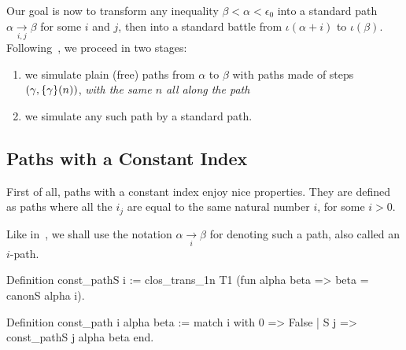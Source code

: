Our goal is now  to transform any inequality $\beta<\alpha<\epsilon_0$ into a standard path $\alpha \xrightarrow[i,j]{} \beta$ for some $i$ and $j$, then into a standard battle
from $\iota(\alpha+i)$ to $\iota(\beta)$. 
Following~\cite{KS81}, we proceed in two stages:
\begin{enumerate}
\item we simulate plain (free) paths from $\alpha$ to $\beta$ with
paths made of steps $(\gamma,\mbox{$\{\gamma\}(n)$})$, \emph{with the same $n$ all along the path}
\item we simulate any such path by a standard path.
\end{enumerate}



\subsection{Paths with a Constant Index}

First of all, paths with a constant index 
enjoy nice properties. They are defined as paths where all the $i_j$ are equal to the same natural number $i$, for some $i>0$. 


Like in~\cite{KS81}, we shall use the notation $\alpha \xrightarrow[i]{} \beta$ for denoting such a path, also called an $i$-path.

\begin{Coqsrc}
Definition const_pathS i :=
    clos_trans_1n T1 (fun alpha beta => beta = canonS alpha i).

Definition const_path i alpha beta :=
  match i with
    0 => False
  | S j => const_pathS j alpha beta
end.
\end{Coqsrc}





